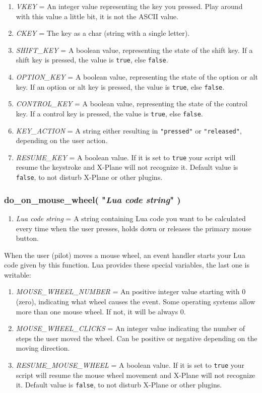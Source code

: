 \documentclass[11pt,parskip=half,a4paper]{scrartcl}
\begin{document}
\begin{enumerate}
	\item \emph{VKEY} = An integer value representing the key you pressed. Play around with this value a little bit, it is not the ASCII value.
	\item \emph{CKEY} = The key as a char (string with a single letter).
	\item \emph{SHIFT\_KEY} = A boolean value, representing the state of the shift key. If a shift key is pressed, the value is \verb|true|, else \verb|false|.
	\item \emph{OPTION\_KEY} = A boolean value, representing the state of the option or alt key. If an option or alt key is pressed, the value is \verb|true|, else \verb|false|.
	\item \emph{CONTROL\_KEY} = A boolean value, representing the state of the control key. If a control key is pressed, the value is \verb|true|, else \verb|false|.
	\item \emph{KEY\_ACTION} = A string either resulting in \verb|"pressed"| or \verb|"released"|, depending on the user action.
	\item \emph{RESUME\_KEY} = A boolean value. If it is set to \verb|true| your script will resume the keystroke and X-Plane will not recognize it. Default value is \verb|false|, to not disturb X-Plane or other plugins.
\end{enumerate}

\subsubsection{do\_on\_mouse\_wheel( "\emph{Lua code string}" )}

\begin{enumerate}
	\item \emph{Lua code string} = A string containing Lua code you want to be calculated every time when the user presses, holds down or releases the primary mouse button.
\end{enumerate}

When the user (pilot) moves a mouse wheel, an event handler starts your Lua code given by this function. Lua provides these special variables, the last one is writable:

\begin{enumerate}
	\item \emph{MOUSE\_WHEEL\_NUMBER} = An positive integer value starting with 0 (zero), indicating what wheel causes the event. Some operating systems allow more than one mouse wheel. If not, it will be always 0.
	\item \emph{MOUSE\_WHEEL\_CLICKS} = An integer value indicating the number of steps the user moved the wheel. Can be positive or negative depending on the moving direction.
	\item \emph{RESUME\_MOUSE\_WHEEL} = A boolean value. If it is set to \verb|true| your script will resume the mouse wheel movement and X-Plane will not recognize it. Default value is \verb|false|, to not disturb X-Plane or other plugins.
\end{enumerate}
\end{document}
